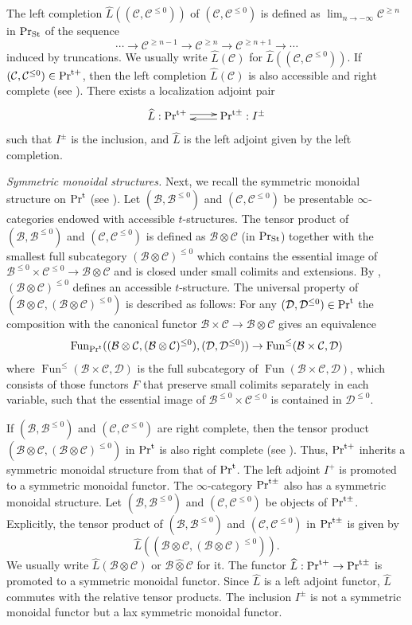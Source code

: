 \documentclass[leqno,12pt]{amsart}
\theoremstyle{plain}
\theoremstyle{definition}
\newcommand{\DDD}{\mathcal{D}}
\newcommand{\CCC}{\mathcal{C}}
\newcommand{\PR}{\textup{Pr}}
\newcommand{\PRT}{\textup{Pr}^{\textup{t}}}
\newcommand{\PRTT}{\textup{Pr}^{\textup{t}+}}
\newcommand{\PRTTT}{\textup{Pr}^{\textup{t}\pm}}
\newcommand{\Fun}{\operatorname{Fun}}
\newcommand{\PRST}{\PR_{\textup{St}}}
\newcommand{\HL}{\widehat{L}}
\begin{document}
The left completion $\HL((\CCC,\CCC^{\le0}))$ of $(\CCC,\CCC^{\le0})$
is defined as
$\lim_{n\to -\infty}\CCC^{\ge n}$ in $\PRST$
of the sequence 
\[
\cdots \to \CCC^{\ge n-1}\to \CCC^{\ge n}\to \CCC^{\ge n+1} \to \cdots
\]
induced by truncations.
We usually write $\HL(\CCC)$ for $\HL((\CCC,\CCC^{\le0}))$.
If $(\CCC,\CCC^{\le0})\in \PRTT$, then the left completion $\HL(\CCC)$ is also accessible and right complete (see \cite[VIII, 4.6.13]{DAG}).
There exists a localization adjoint pair
\[
\xymatrix{
\HL :\PRTT \ar@<0.5ex>[r] &  \PRTTT:I^{\pm}  \ar@<0.5ex>[l]  
}
\]
such that $I^\pm$ is the inclusion, and $\HL$ is the left adjoint given by the left completion.

{\it Symmetric monoidal structures.}
Next, we recall the symmetric monoidal structure on $\PRT$ (see \cite[VIII, 4.6.1]{DAG}).
Let $(\mathcal{B},\mathcal{B}^{\le0})$ and $(\CCC,\CCC^{\le0})$ be presentable $\infty$-categories endowed with accessible $t$-structures. 
The tensor product of $(\mathcal{B},\mathcal{B}^{\le0})$ and $(\CCC,\CCC^{\le0})$
is defined as
$\mathcal{B}\otimes \CCC$ (in $\PRST$) 
together with the smallest full subcategory $(\mathcal{B}\otimes \CCC)^{\le0}$
which contains the essential image of $\mathcal{B}^{\le0}\times \CCC^{\le0}\to \mathcal{B}\otimes \CCC$
and is closed under small colimits and extensions.
By \cite[1.4.5.11]{HA}, $(\mathcal{B}\otimes \CCC)^{\le0}$ defines an accessible $t$-structure.
The universal property of $(\mathcal{B}\otimes \CCC, (\mathcal{B}\otimes \CCC)^{\le0})$ is described as follows: For any $(\DDD, \DDD^{\le0})\in \PRT$
the composition with the canonical functor $\mathcal{B}\times \CCC\to \mathcal{B}\otimes \CCC$ gives an equivalence
\[
\Fun_{\PRT}((\mathcal{B}\otimes \CCC, (\mathcal{B}\otimes \CCC)^{\le0}),(\DDD,\DDD^{\le0}))\to \Fun^{\le}(\mathcal{B}\times \CCC,\DDD)
\]
where $\Fun^{\le}(\mathcal{B}\times \CCC,\DDD)$ is the full subcategory of $\Fun(\mathcal{B}\times \CCC,\DDD)$,
which consists of those functors $F$ that preserve small colimits separately in each variable, such that the essential image of $\mathcal{B}^{\le0}\times \CCC^{\le0}$ 
is contained in $\DDD^{\le0}$.

If $(\mathcal{B},\mathcal{B}^{\le0})$ and $(\CCC,\CCC^{\le0})$ are right complete,
then the tensor product $(\mathcal{B}\otimes \CCC, (\mathcal{B}\otimes \CCC)^{\le0})$ in $\PRT$
is also right complete (see \cite[VIII, 4.6.11]{DAG}).
Thus, $\PRTT$ inherits a symmetric monoidal structure from that of $\PRT$.
The left adjoint $I^+$ is promoted
to a symmetric monoidal functor.
The $\infty$-category $\PRTTT$ also has a symmetric monoidal structure.
Let $(\mathcal{B},\mathcal{B}^{\le0})$ and $(\CCC,\CCC^{\le0})$ be objects of $\PRTTT$.
Explicitly, the tensor product of $(\mathcal{B},\mathcal{B}^{\le0})$ and $(\CCC,\CCC^{\le0})$ in $\PRTTT$
is given by 
\[
\HL((\mathcal{B}\otimes\CCC,  (\mathcal{B}\otimes \CCC)^{\le0})).
\]
We usually write $\HL(\mathcal{B}\otimes\CCC)$ or $\mathcal{B}\widehat{\otimes}\CCC$ for it.
The functor $\HL:\PRTT\to \PRTTT$ is promoted to a symmetric monoidal functor. 
Since $\HL$ is a left adjoint functor, $\HL$ commutes with the relative tensor products.
The inclusion $I^{\pm}$
is not a symmetric monoidal functor but a lax symmetric monoidal functor.
\end{document}
